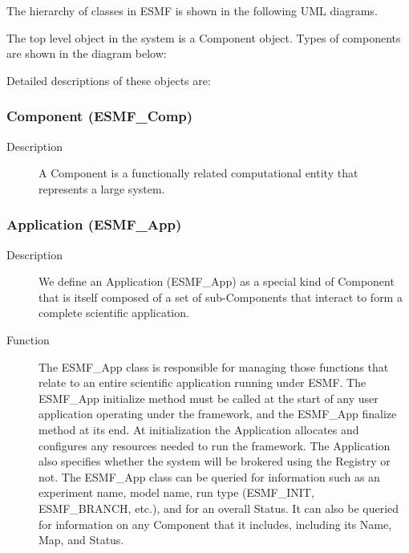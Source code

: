 The hierarchy of classes in ESMF is shown in the following UML diagrams.  

The top level object in the system is a Component object.
Types of components are shown in the diagram below:


Detailed descriptions of these objects are:

\subsubsection{Component (ESMF\_Comp)} 
\begin{description}
\item [Description] A Component is a functionally related computational entity that represents 
a large system.  
\end{description}

\subsubsection{Application (ESMF\_App)}
\begin{description} 
\item [Description] We define an Application (ESMF\_App) as a special kind of Component 
that is itself composed of a set of sub-Components that interact to form a complete scientific
application.  
\item [Function] The ESMF\_App class is responsible for managing those functions that relate 
to an entire scientific application running under ESMF.  The ESMF\_App initialize method 
must be called at the start of any user application operating under the framework, and
the ESMF\_App finalize method at its end.  At initialization the Application allocates and 
configures any resources needed to run the framework.  The Application also specifies whether 
the system will be brokered using the Registry or not.  The ESMF\_App class can be queried 
for information such as an experiment name, model name, run type (ESMF\_INIT, 
ESMF\_BRANCH, etc.), and for an overall Status.  It can also be queried for
information on any Component that it includes, including its Name, Map, and
Status.
\end{description}

